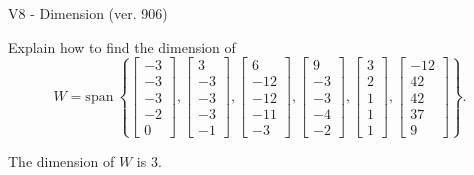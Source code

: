 \begin{exercise}
  \begin{exerciseTitle}V8 - Dimension (ver. 906)\end{exerciseTitle}
  \begin{exerciseStatement}
    Explain how to find the dimension of 
\[W=\mathrm{span}\ \left\{\left[\begin{array}{r}
-3 \\
-3 \\
-3 \\
-2 \\
0
\end{array}\right] , \left[\begin{array}{r}
3 \\
-3 \\
-3 \\
-3 \\
-1
\end{array}\right] , \left[\begin{array}{r}
6 \\
-12 \\
-12 \\
-11 \\
-3
\end{array}\right] , \left[\begin{array}{r}
9 \\
-3 \\
-3 \\
-4 \\
-2
\end{array}\right] , \left[\begin{array}{r}
3 \\
2 \\
1 \\
1 \\
1
\end{array}\right] , \left[\begin{array}{r}
-12 \\
42 \\
42 \\
37 \\
9
\end{array}\right]\right\}.\]



  \end{exerciseStatement}
  \begin{exerciseAnswer}
   The dimension of \(W\) is  \(3\).
  


  \end{exerciseAnswer}
\end{exercise}